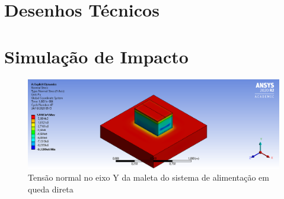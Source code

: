 \begin{apendicesenv}
\chapter{Desenhos Técnicos}
\label{Drafts_do_projeto}


%



%



























\chapter{Simulação de Impacto}
\label{simulacoes_impacto}

\begin{figure}[htb]
    \centering
    \includegraphics[width=1.0\textwidth, angle=0]{figuras/estrutura_simulacaoImpacto/ignicaoNormalYLadoMaior.png}
    \caption{Tensão normal no eixo Y da maleta do sistema de alimentação em queda direta}
    \label{fig:simulacaoImpacto_01}
\end{figure}


\end{apendicesenv}
